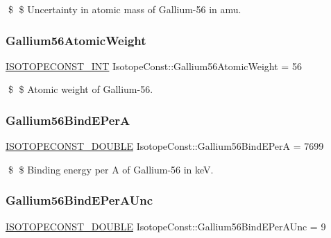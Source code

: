 \$ \$ Uncertainty in atomic mass of Gallium-\/56 in amu. \mbox{\label{group___isotope_const-_gallium-_ga56_gab49a0b8ef2989fde388fdff800d0d6bb}} 
\subsubsection{\texorpdfstring{Gallium56\+Atomic\+Weight}{Gallium56AtomicWeight}}
{\footnotesize\ttfamily \mbox{\hyperlink{group___isotope_const-_macros_ga5f18360b3e99483a35c32d789e62621c}{I\+S\+O\+T\+O\+P\+E\+C\+O\+N\+S\+T\+\_\+\+I\+NT}} Isotope\+Const\+::\+Gallium56\+Atomic\+Weight = 56}

\$ \$ Atomic weight of Gallium-\/56. \mbox{\label{group___isotope_const-_gallium-_ga56_ga309b310f785fc404b6fbb97ecaeecfcf}} 
\subsubsection{\texorpdfstring{Gallium56\+Bind\+E\+PerA}{Gallium56BindEPerA}}
{\footnotesize\ttfamily \mbox{\hyperlink{group___isotope_const-_macros_ga8f45a7272ce02c0b4c65c44636ed719a}{I\+S\+O\+T\+O\+P\+E\+C\+O\+N\+S\+T\+\_\+\+D\+O\+U\+B\+LE}} Isotope\+Const\+::\+Gallium56\+Bind\+E\+PerA = 7699}

\$ \$ Binding energy per A of Gallium-\/56 in keV. \mbox{\label{group___isotope_const-_gallium-_ga56_ga9336bff73a4f97bf0363f257d8d7d11f}} 
\subsubsection{\texorpdfstring{Gallium56\+Bind\+E\+Per\+A\+Unc}{Gallium56BindEPerAUnc}}
{\footnotesize\ttfamily \mbox{\hyperlink{group___isotope_const-_macros_ga8f45a7272ce02c0b4c65c44636ed719a}{I\+S\+O\+T\+O\+P\+E\+C\+O\+N\+S\+T\+\_\+\+D\+O\+U\+B\+LE}} Isotope\+Const\+::\+Gallium56\+Bind\+E\+Per\+A\+Unc = 9}


